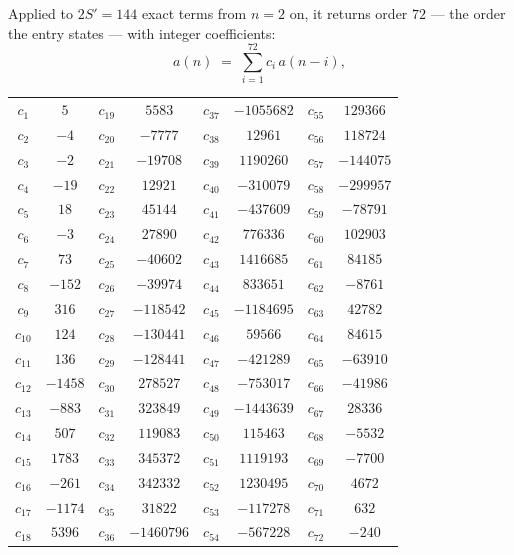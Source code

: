\documentclass[11pt,a4paper]{article}
\theoremstyle{plain}
\theoremstyle{definition}
\begin{document}
Applied to $2S'=144$ exact terms from $n=2$ on, it returns order $72$ --- the
order the entry states --- with integer coefficients:
\[
a(n)\;=\;\sum_{i=1}^{72}c_i\,a(n-i),
\]
\begin{center}\small
\begin{tabular}{cccccccc}
$c_{1}$ & $5$ & $c_{19}$ & $5583$ & $c_{37}$ & $-1055682$ & $c_{55}$ & $129366$ \\
$c_{2}$ & $-4$ & $c_{20}$ & $-7777$ & $c_{38}$ & $12961$ & $c_{56}$ & $118724$ \\
$c_{3}$ & $-2$ & $c_{21}$ & $-19708$ & $c_{39}$ & $1190260$ & $c_{57}$ & $-144075$ \\
$c_{4}$ & $-19$ & $c_{22}$ & $12921$ & $c_{40}$ & $-310079$ & $c_{58}$ & $-299957$ \\
$c_{5}$ & $18$ & $c_{23}$ & $45144$ & $c_{41}$ & $-437609$ & $c_{59}$ & $-78791$ \\
$c_{6}$ & $-3$ & $c_{24}$ & $27890$ & $c_{42}$ & $776336$ & $c_{60}$ & $102903$ \\
$c_{7}$ & $73$ & $c_{25}$ & $-40602$ & $c_{43}$ & $1416685$ & $c_{61}$ & $84185$ \\
$c_{8}$ & $-152$ & $c_{26}$ & $-39974$ & $c_{44}$ & $833651$ & $c_{62}$ & $-8761$ \\
$c_{9}$ & $316$ & $c_{27}$ & $-118542$ & $c_{45}$ & $-1184695$ & $c_{63}$ & $42782$ \\
$c_{10}$ & $124$ & $c_{28}$ & $-130441$ & $c_{46}$ & $59566$ & $c_{64}$ & $84615$ \\
$c_{11}$ & $136$ & $c_{29}$ & $-128441$ & $c_{47}$ & $-421289$ & $c_{65}$ & $-63910$ \\
$c_{12}$ & $-1458$ & $c_{30}$ & $278527$ & $c_{48}$ & $-753017$ & $c_{66}$ & $-41986$ \\
$c_{13}$ & $-883$ & $c_{31}$ & $323849$ & $c_{49}$ & $-1443639$ & $c_{67}$ & $28336$ \\
$c_{14}$ & $507$ & $c_{32}$ & $119083$ & $c_{50}$ & $115463$ & $c_{68}$ & $-5532$ \\
$c_{15}$ & $1783$ & $c_{33}$ & $345372$ & $c_{51}$ & $1119193$ & $c_{69}$ & $-7700$ \\
$c_{16}$ & $-261$ & $c_{34}$ & $342332$ & $c_{52}$ & $1230495$ & $c_{70}$ & $4672$ \\
$c_{17}$ & $-1174$ & $c_{35}$ & $31822$ & $c_{53}$ & $-117278$ & $c_{71}$ & $632$ \\
$c_{18}$ & $5396$ & $c_{36}$ & $-1460796$ & $c_{54}$ & $-567228$ & $c_{72}$ & $-240$ \\
\end{tabular}
\end{center}
\end{document}
